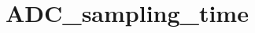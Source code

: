 \hypertarget{group___a_d_c__sampling__time}{\section{A\-D\-C\-\_\-sampling\-\_\-time}
\label{group___a_d_c__sampling__time}
}
